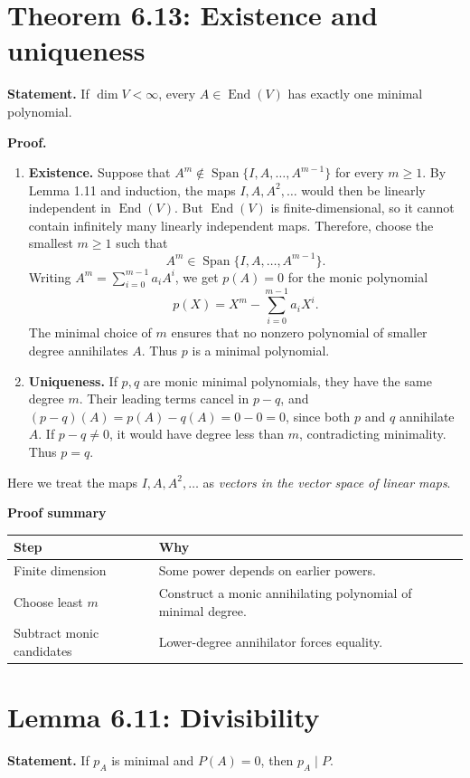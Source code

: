 \documentclass[11pt,a4paper]{article}
\newenvironment{proofsteps}{\begin{enumerate}\setlength{\itemsep}{4pt}}{\end{enumerate}}
\newcommand{\prooftable}[1]{\medskip\textbf{Proof summary}\par\smallskip #1\medskip}
\begin{document}
\section*{Theorem 6.13: Existence and uniqueness}
\textbf{Statement.} If \(\dim V<\infty\), every \(A\in\operatorname{End}(V)\)
has exactly one minimal polynomial.

\textbf{Proof.}
\begin{proofsteps}
\item \textbf{Existence.} Suppose that \(A^m\notin\operatorname{Span}\{I,A,\ldots,A^{m-1}\}\) for every \(m\geq1\). By Lemma 1.11 and induction, the maps \(I,A,A^2,\ldots\) would then be linearly independent in \(\operatorname{End}(V)\). But \(\operatorname{End}(V)\) is finite-dimensional, so it cannot contain infinitely many linearly independent maps. Therefore, choose the smallest \(m\geq1\) such that
\[
A^m\in\operatorname{Span}\{I,A,\ldots,A^{m-1}\}.
\]
Writing \(A^m=\sum_{i=0}^{m-1}a_iA^i\), we get \(p(A)=0\) for the monic polynomial
\[
p(X)=X^m-\sum_{i=0}^{m-1}a_iX^i.
\]
The minimal choice of \(m\) ensures that no nonzero polynomial of smaller degree annihilates \(A\). Thus \(p\) is a minimal polynomial.
\item \textbf{Uniqueness.} If \(p,q\) are monic minimal polynomials,
they have the same degree \(m\). Their leading terms cancel in \(p-q\),
and \((p-q)(A)=p(A)-q(A)=0-0=0\), since both \(p\) and \(q\) annihilate \(A\). If \(p-q\neq0\), it would have degree less than \(m\),
contradicting minimality. Thus \(p=q\).
\end{proofsteps}

\begin{personalnote}
Here we treat the maps \(I,A,A^2,\ldots\)
as \emph{vectors in the vector space of linear maps}.
\end{personalnote}
\prooftable{\begin{tabularx}{\linewidth}{@{}p{.28\linewidth}X@{}}\hline
Step & Why\\\hline
Finite dimension & Some power depends on earlier powers.\\
Choose least \(m\) & Construct a monic annihilating polynomial of minimal degree.\\
Subtract monic candidates & Lower-degree annihilator forces equality.\\\hline
\end{tabularx}}

\section*{Lemma 6.11: Divisibility}
\textbf{Statement.} If \(p_A\) is minimal and \(P(A)=0\), then \(p_A\mid P\).
\end{document}
